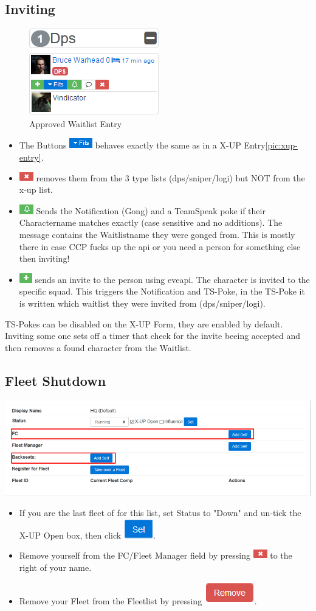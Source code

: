 \documentclass[oneside,a4paper]{article}
\newcommand{\piccross}{\includegraphics{cross.png}\xspace}
\newcommand{\picbell}{\includegraphics{bell.png}\xspace}
\newcommand{\picfits}{\includegraphics{fits.png}\xspace}
\newcommand{\picinvite}{\includegraphics{invite.png}\xspace}
\newcommand{\picfleetsetting}{\includegraphics[width=\textwidth]{takeover-fc.png}\xspace}
\newcommand{\picset}{\includegraphics{set.png}\xspace}
\newcommand{\picremove}{\includegraphics[scale=0.5]{remove.png}\xspace}
\begin{document}
\subsection{Inviting}
\begin{figure}[h]
	\centering
	\caption{Approved Waitlist Entry}
	\includegraphics{approved-entry.png}
\end{figure}

\begin{itemize}
	\item The Buttons \picfits behaves exactly the same as in a X-UP Entry\ref{pic:xup-entry}.
	\item \piccross removes them from the 3 type lists (dps/sniper/logi) but NOT from the x-up list.
	\item \picbell Sends the Notification (Gong) and a TeamSpeak poke if their Charactername matches exactly (case sensitive and no additions). The message contains the Waitlistname they were gonged from. This is mostly there in case CCP fucks up the api or you need a person for something else then inviting!
	\item \picinvite sends an invite to the person using eveapi. The character is invited to the specific squad. This triggers the Notification and TS-Poke, in the TS-Poke it is written which waitlist they were invited from (dps/sniper/logi).
\end{itemize}
TS-Pokes can be disabled on the X-UP Form, they are enabled by default.
Inviting some one sets off a timer that check for the invite beeing accepted and then removes a found character from the Waitlist.

\subsection{Fleet Shutdown}
\picfleetsetting
\begin{itemize}
	\item If you are the last fleet of for this list, set Status to "Down" and un-tick the X-UP Open box, then click \picset.
	\item Remove yourself from the FC/Fleet Manager field by pressing \piccross to the right of your name.
	\item Remove your Fleet from the Fleetlist by pressing \picremove.
\end{itemize}
\end{document}
